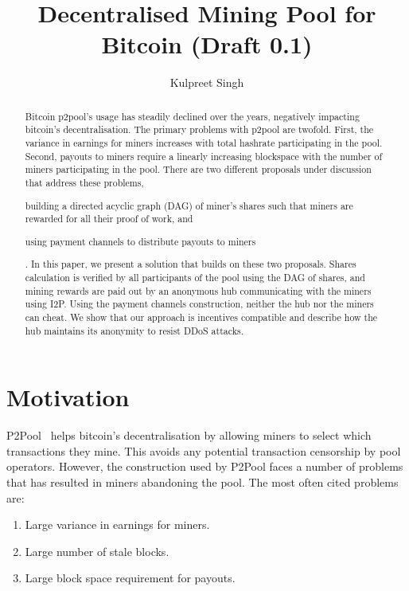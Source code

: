 \documentclass{article}
\title{Decentralised Mining Pool for Bitcoin (Draft 0.1)}
\author{Kulpreet Singh}
\date{}
\begin{document}
\maketitle

\begin{abstract}
  Bitcoin p2pool's usage has steadily declined over the years,
  negatively impacting bitcoin's decentralisation. The primary
  problems with p2pool are twofold. First, the variance in earnings
  for miners increases with total hashrate participating in the
  pool. Second, payouts to miners require a linearly increasing
  blockspace with the number of miners participating in the
  pool. There are two different proposals under discussion that
  address these problems,
  \begin{enumerate*}[label=(\roman*)]
  \item building a directed acyclic graph (DAG) of miner's shares such
    that miners are rewarded for all their proof of work, and
  \item  using payment channels to distribute payouts to miners
  \end{enumerate*}. In this paper, we present a solution that builds
  on these two proposals. Shares calculation is verified by all
  participants of the pool using the DAG of shares, and mining rewards
  are paid out by an anonymous hub communicating with the miners using
  I2P. Using the payment channels construction, neither the hub nor
  the miners can cheat. We show that our approach is incentives
  compatible and describe how the hub maintains its anonymity to
  resist DDoS attacks.
\end{abstract}
   
\section{Motivation}

P2Pool~\cite{p2pool:wiki} helps bitcoin's decentralisation by allowing
miners to select which transactions they mine. This avoids any
potential transaction censorship by pool operators. However, the
construction used by P2Pool faces a number of problems that has
resulted in miners abandoning the pool. The most often cited problems
are:

\begin{enumerate}
\item Large variance in earnings for miners.
\item Large number of stale blocks.
\item Large block space requirement for payouts.
\end{enumerate}
\end{document}
